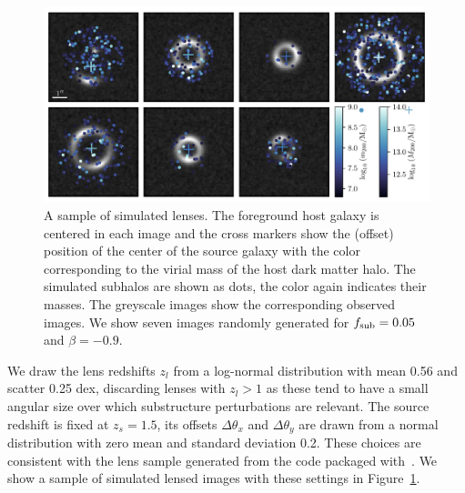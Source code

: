 \documentclass[twocolumn]{aastex63}
\begin{document}
\begin{figure}
\centering
\includegraphics[width=1.\textwidth]{figures/simulations}
\caption{A sample of simulated lenses. The foreground host galaxy is centered in each image and the cross markers show the (offset) position of the center of the source galaxy with the color corresponding to the virial mass of the host dark matter halo. The simulated subhalos are shown as dots, the color again indicates their masses. The greyscale images show the corresponding observed images. We show seven images randomly generated for $f_{\mathrm{sub}} = 0.05$ and $\beta = -0.9$. }
\label{fig:simulations}
\end{figure}

We draw the lens redshifts $z_l$ from a log-normal distribution with mean 0.56 and scatter 0.25 dex, discarding lenses with $z_l > 1$ as these tend to have a small angular size over which substructure perturbations are relevant. The source redshift is fixed at $z_s = 1.5$, its offsets $\Delta\theta_x$ and $\Delta\theta_y$ are drawn from a normal distribution with zero mean and standard deviation 0.2. These choices are consistent with the lens sample generated from the  code packaged with~\citet{2015ApJ...811...20C}. We show a sample of simulated lensed images with these settings in Figure~\ref{fig:simulations}.
\end{document}
